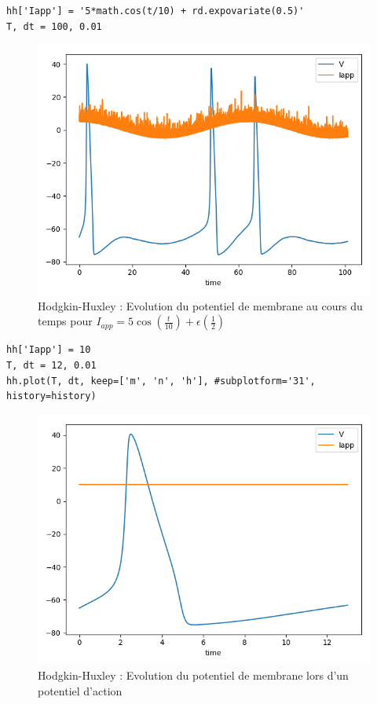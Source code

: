 \documentclass[12pt]{scrartcl}
\begin{document}
\clearpage
\begin{lstlisting}[caption = {Hodgkin-Huxley : Simulation du modèle pour $I_{app} = 5\cos(\frac{t}{10})+\epsilon(\frac12)$}]
hh['Iapp'] = '5*math.cos(t/10) + rd.expovariate(0.5)'
T, dt = 100, 0.01
\end{lstlisting}

\begin{figure}[!h]
\centering
\includegraphics[scale=0.8]{imgs/hh41.png}
\caption{Hodgkin-Huxley : Evolution du potentiel de membrane au cours du temps pour $I_{app} = 5\cos(\frac{t}{10})+\epsilon(\frac12)$}
\label{hh41}
\end{figure}

\clearpage 
\begin{lstlisting}[caption = {Hodgkin-Huxley : Evolution de m, n et h lors d'un potentiel d'action}]
hh['Iapp'] = 10
T, dt = 12, 0.01
hh.plot(T, dt, keep=['m', 'n', 'h'], #subplotform='31', 
history=history)
\end{lstlisting}

\begin{figure}[!h]
\centering
\includegraphics[scale=0.5]{imgs/hh51.png}
\caption{Hodgkin-Huxley : Evolution du potentiel de membrane lors d'un potentiel d'action}
\label{hh51}
\end{figure}
\end{document}
